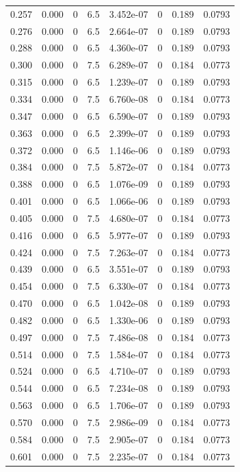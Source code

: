 \documentclass[preview]{standalone}
\begin{document}
{{\begin{tabular}{L{1.2cm}C{1.2cm} C{0.3cm}C{0.5cm} C{1.4cm}C{1.4cm} C{1.4cm}C{1.4cm}}
  0.257  &  0.000  & 0     & 6.5 &  3.452e-07  & 0  & 0.189 &  0.0793   \\ 
  0.276  &  0.000  & 0     & 6.5 &  2.664e-07  & 0  & 0.189 &  0.0793   \\ 
  0.288  &  0.000  & 0     & 6.5 &  4.360e-07  & 0  & 0.189 &  0.0793   \\ 
  0.300  &  0.000  & 0     & 7.5 &  6.289e-07  & 0  & 0.184 &  0.0773   \\ 
  0.315  &  0.000  & 0     & 6.5 &  1.239e-07  & 0  & 0.189 &  0.0793   \\ 
  0.334  &  0.000  & 0     & 7.5 &  6.760e-08  & 0  & 0.184 &  0.0773   \\ 
  0.347  &  0.000  & 0     & 6.5 &  6.590e-07  & 0  & 0.189 &  0.0793   \\ 
  0.363  &  0.000  & 0     & 6.5 &  2.399e-07  & 0  & 0.189 &  0.0793   \\ 
  0.372  &  0.000  & 0     & 6.5 &  1.146e-06  & 0  & 0.189 &  0.0793   \\ 
  0.384  &  0.000  & 0     & 7.5 &  5.872e-07  & 0  & 0.184 &  0.0773   \\ 
  0.388  &  0.000  & 0     & 6.5 &  1.076e-09  & 0  & 0.189 &  0.0793   \\ 
  0.401  &  0.000  & 0     & 6.5 &  1.066e-06  & 0  & 0.189 &  0.0793   \\ 
  0.405  &  0.000  & 0     & 7.5 &  4.680e-07  & 0  & 0.184 &  0.0773   \\ 
  0.416  &  0.000  & 0     & 6.5 &  5.977e-07  & 0  & 0.189 &  0.0793   \\ 
  0.424  &  0.000  & 0     & 7.5 &  7.263e-07  & 0  & 0.184 &  0.0773   \\ 
  0.439  &  0.000  & 0     & 6.5 &  3.551e-07  & 0  & 0.189 &  0.0793   \\ 
  0.454  &  0.000  & 0     & 7.5 &  6.330e-07  & 0  & 0.184 &  0.0773   \\ 
  0.470  &  0.000  & 0     & 6.5 &  1.042e-08  & 0  & 0.189 &  0.0793   \\ 
  0.482  &  0.000  & 0     & 6.5 &  1.330e-06  & 0  & 0.189 &  0.0793   \\ 
  0.497  &  0.000  & 0     & 7.5 &  7.486e-08  & 0  & 0.184 &  0.0773   \\ 
  0.514  &  0.000  & 0     & 7.5 &  1.584e-07  & 0  & 0.184 &  0.0773   \\ 
  0.524  &  0.000  & 0     & 6.5 &  4.710e-07  & 0  & 0.189 &  0.0793   \\ 
  0.544  &  0.000  & 0     & 6.5 &  7.234e-08  & 0  & 0.189 &  0.0793   \\ 
  0.563  &  0.000  & 0     & 6.5 &  1.706e-07  & 0  & 0.189 &  0.0793   \\ 
  0.570  &  0.000  & 0     & 7.5 &  2.986e-09  & 0  & 0.184 &  0.0773   \\ 
  0.584  &  0.000  & 0     & 7.5 &  2.905e-07  & 0  & 0.184 &  0.0773   \\ 
  0.601  &  0.000  & 0     & 7.5 &  2.235e-07  & 0  & 0.184 &  0.0773   \\ 
\hline 
\end{tabular} 

}}
\end{document}
